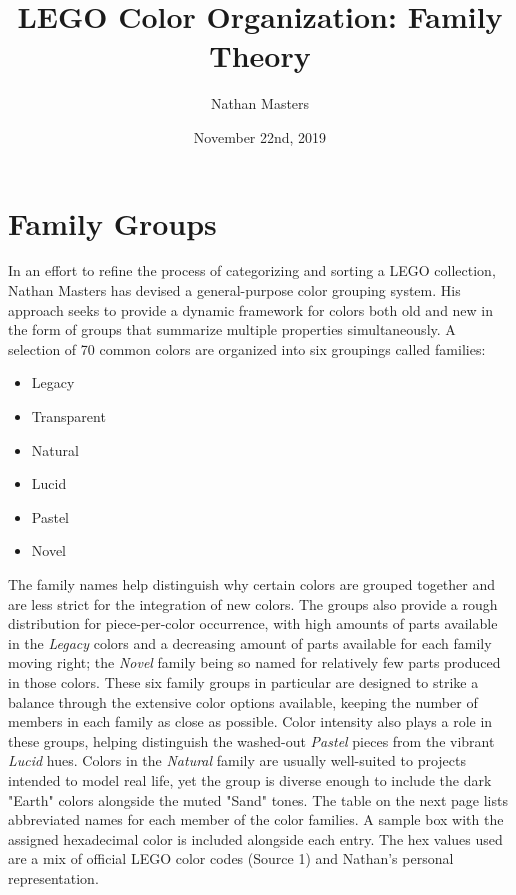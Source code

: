 \documentclass{article}
\title{LEGO\textsuperscript{\textregistered} Color Organization: Family Theory}
\author{Nathan Masters}
\date{November 22nd, 2019}
\begin{document}
\maketitle

\section{Family Groups}
In an effort to refine the process of categorizing and sorting a LEGO\textsuperscript{\textregistered} collection, Nathan Masters has devised a general-purpose color grouping system. His approach seeks to provide a dynamic framework for colors both old and new in the form of groups that summarize multiple properties simultaneously.
\newline
\newline
A selection of 70 common colors are organized into six groupings called families:
\begin{itemize}
    \item Legacy
    \item Transparent
    \item Natural
    \item Lucid
    \item Pastel
    \item Novel
\end{itemize}
The family names help distinguish why certain colors are grouped together and are less strict for the integration of new colors. The groups also provide a rough distribution for piece-per-color occurrence, with high amounts of parts available in the \textit{Legacy} colors and a decreasing amount of parts available for each family moving right; the \textit{Novel} family being so named for relatively few parts produced in those colors. 
\newline
\newline
These six family groups in particular are designed to strike a balance through the extensive color options available, keeping the number of members in each family as close as possible. Color intensity also plays a role in these groups, helping distinguish the washed-out \textit{Pastel} pieces from the vibrant \textit{Lucid} hues. Colors in the \textit{Natural} family are usually well-suited to projects intended to model real life, yet the group is diverse enough to include the dark "Earth" colors alongside the muted "Sand" tones.
\newline
\newline
The table on the next page lists abbreviated names for each member of the color families. A sample box with the assigned hexadecimal color is included alongside each entry. The hex values used are a mix of official LEGO\textsuperscript{\textregistered} color codes (Source 1) and Nathan's personal representation. 
\end{document}
